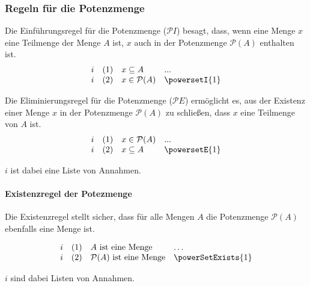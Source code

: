 \documentclass{book}
\theoremstyle{plain}
\theoremstyle{remark}
\theoremstyle{definition}
\begin{document}
\subsubsection{Regeln für die Potenzmenge}
\label{rule:powersetI} \label{rule:powersetE}

Die Einführungsregel für die Potenzmenge (\( \mathcal{P}I \)) besagt, dass, wenn eine Menge \( x \) eine Teilmenge der Menge \( A \) ist, \( x \) auch in der Potenzmenge \( \mathcal{P}(A) \) enthalten ist.
\[
\begin{array}{llll}
	i & (1) & x \subseteq A & ... \\
	i & (2) & x \in \mathcal{P}(A) & \powersetI{1} \\
\end{array}
\]

Die Eliminierungsregel für die Potenzmenge (\( \mathcal{P}E \)) ermöglicht es, aus der Existenz einer Menge \( x \) in der Potenzmenge \( \mathcal{P}(A) \) zu schließen, dass \( x \) eine Teilmenge von \( A \) ist.
\[
\begin{array}{llll}
	i & (1) & x \in \mathcal{P}(A) & ... \\
	i & (2) & x \subseteq A & \powersetE{1} \\
\end{array}
\]

\(i\) ist dabei eine Liste von Annahmen.

\paragraph{Existenzregel der Potezmenge}
\label{rule:powerSetExists}
Die Existenzregel stellt sicher, dass für alle Mengen \(A\) die Potenzmenge \(\mathcal{P}(A)\) ebenfalls eine Menge ist.

\[
\begin{array}{llll}
	i & (1) & A \text{ ist eine Menge} & \dots  \\
	i & (2) & \mathcal{P}(A)\text{ ist eine Menge} & \powerSetExists{1} \\
\end{array}
\]

\(i\) sind dabei Listen von Annahmen.
\end{document}
